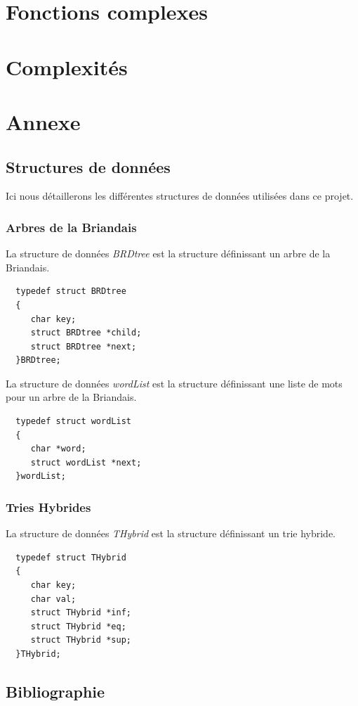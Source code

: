 \documentclass[a4paper,8pt]{report}
\begin{document}
\chapter{Fonctions complexes}

\chapter{Complexit\'es}

\chapter{Annexe}
\section*{Structures de donn\'ees}\label{sec:name}

Ici nous d\'etaillerons les diff\'erentes structures de donn\'ees utilis\'ees dans ce projet.

\subsection*{Arbres de la Briandais}\label{sec:name}

La structure de donn\'ees \textit{BRDtree} est la structure d\'efinissant un arbre de la Briandais.
\begin{verbatim}
  typedef struct BRDtree
  {
     char key; 
     struct BRDtree *child; 
     struct BRDtree *next; 
  }BRDtree;
\end{verbatim}

La structure de donn\'ees \textit{wordList} est la structure d\'efinissant une liste de mots pour un arbre de la Briandais.
\begin{verbatim}
  typedef struct wordList
  {
     char *word;
     struct wordList *next;
  }wordList;
\end{verbatim}

\subsection*{Tries Hybrides}\label{sec:name}

La structure de donn\'ees \textit{THybrid} est la structure d\'efinissant un trie hybride.
\begin{verbatim}
  typedef struct THybrid
  {
     char key;
     char val;
     struct THybrid *inf;
     struct THybrid *eq;
     struct THybrid *sup;
  }THybrid;
\end{verbatim}

\listoffigures
\newpage
\section*{Bibliographie}\label{sec:name}
\end{document}
